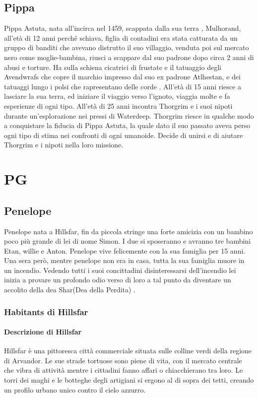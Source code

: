 \documentclass{article}
\begin{document}
          \subsection{Pippa} Pippa Astuta, nata all'incirca nel 1459, scappata dalla sua terra , Mulhorand, all'età di 12 anni perché schiava, figlia di contadini era stata catturata da un gruppo di banditi che avevano distrutto il suo villaggio, venduta poi sul mercato nero come moglie-bambina, riusci a scappare dal suo padrone dopo circa 2 anni di abusi e torture. Ha sulla  schiena cicatrici di frustate e il tatuaggio degli Avendwrafs che copre il marchio impresso dal suo ex padrone Atlhestan, e dei tatuaggi lungo i polsi che rapresentano delle corde . All'età di 15 anni riesce a lasciare la sua terra, ed iniziare il viaggio verso l'ignoto, viaggia molte e fa esperienze di ogni tipo. All'età di 25 anni incontra Thorgrim e i suoi nipoti durante un'esplorazione nei pressi di Waterdeep. Thorgrim riesce in qualche modo a conquistare la fiducia di Pippa Astuta, la quale dato il suo passato aveva perso ogni tipo di stima nei confronti di ogni umanoide. Decide di unirsi e di aiutare Thorgrim e i nipoti nella loro missione.
\section{PG}
          \subsection{Penelope}Penelope nata a Hillsfar, fin da piccola stringe una forte amicizia con un bambino poco più grande di lei di nome Simon. I due si sposeranno e avranno tre bambini Etan, willie e Anton.
Penelope vive felicemente con la sua famiglia per 15 anni. Una sera però, mentre penelope non era in casa, tutta la sua famiglia muore in un incendio. Vedendo tutti i suoi concittadini disinteressarsi dell’incendio lei inizia a provare un profondo odio verso di loro a tal punto da diventare un accolito della dea Shar(Dea della Perdita) .


              \subsubsection*{Habitants di Hillsfar}

                  \paragraph*{Descrizione di Hillsfar}
Hillsfar è una pittoresca città commerciale situata sulle colline verdi della regione di Arvandor. Le sue strade tortuose sono piene di vita, con il mercato centrale che vibra di attività mentre i cittadini fanno affari o chiacchierano tra loro. Le torri dei maghi e le botteghe degli artigiani si ergono al di sopra dei tetti, creando un profilo urbano unico contro il cielo azzurro.
\end{document}
